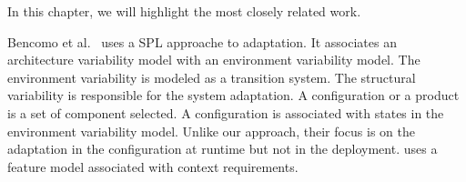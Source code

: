 
In this chapter, we will highlight the most closely related
work.





Bencomo et al.~\cite{bencomo_dynamically_2008} uses a SPL approache to adaptation. It  associates an architecture variability model with an environment variability model. The environment variability is modeled as a transition system. The structural variability is responsible for the system adaptation. A configuration or a product is a set of component selected. A configuration is associated with states in the environment variability model. Unlike our approach, their focus is on the adaptation in the configuration at runtime but not in the deployment. \citep{mizouni_framework_2014} uses a feature model associated with context requirements.

